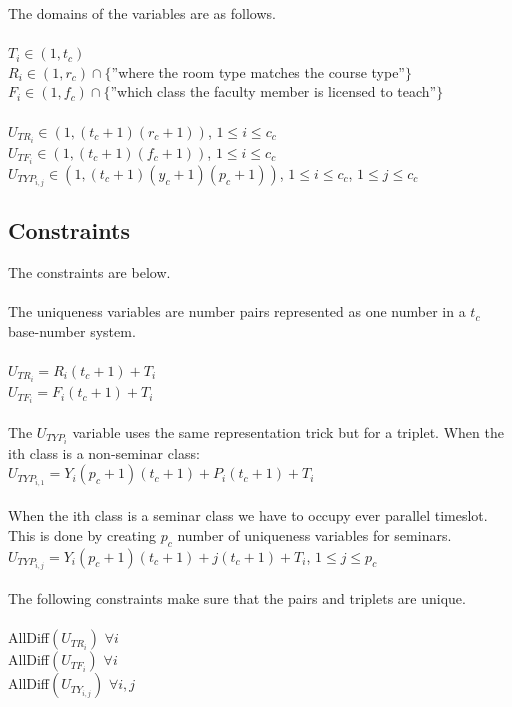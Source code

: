 The domains of the variables are as follows.\\
\\
$T_i \in{} (1,t_c)$\\
$R_i \in{} (1,r_c) \cap \{$''where the room type matches the course type''$\}$\\
$F_i \in{} (1,f_c) \cap \{$''which class the faculty member is licensed to teach''$\}$\\
\\
$U_{TR_i} \in{} (1, (t_c + 1) (r_c + 1))$, $1\leq{}i\leq{}c_c$\\
$U_{TF_i} \in{} (1, (t_c + 1) (f_c + 1))$, $1\leq{}i\leq{}c_c$\\
$U_{TYP_{i,j}} \in{} (1, (t_c + 1) (y_c + 1) (p_c + 1))$, $1\leq{}i\leq{}c_c$, $1\leq{}j\leq{}c_c$\\

\subsection{Constraints}

The constraints are below.\\
\\
The uniqueness variables are number pairs represented as one number in a $t_c$ base-number system.\\
\\
$U_{TR_i} = R_i (t_c + 1) + T_i$\\
$U_{TF_i} = F_i (t_c + 1) + T_i$\\
\\
The $U_{TYP_i}$ variable uses the same representation trick but for a triplet.
When the ith class is a non-seminar class:\\
$U_{TYP_{i,1}} = Y_i (p_c + 1) (t_c + 1) + P_i (t_c + 1) + T_i$\\
\\
When the ith class is a seminar class we have to occupy ever parallel timeslot. This is done by creating $p_c$ number of uniqueness variables for seminars.\\
$U_{TYP_{i,j}} = Y_i (p_c + 1) (t_c + 1) + j (t_c + 1) + T_i$, $1\leq{}j\leq{}p_c$\\
\\
The following constraints make sure that the pairs and triplets are unique.\\
\\
AllDiff$(U_{TR_i})$ $\forall{}i$\\
AllDiff$(U_{TF_i})$ $\forall{}i$\\
AllDiff$(U_{TY_{i,j}})$ $\forall{}i,j$\\

